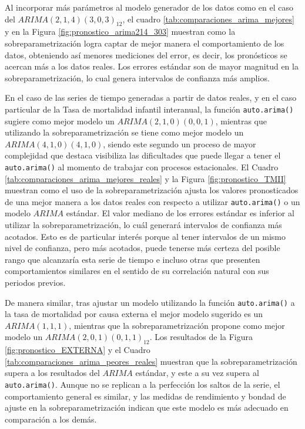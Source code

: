 \documentclass[
]{article}
\begin{document}
Al incorporar más parámetros al modelo generador de los datos como en el
caso del \(ARIMA(2,1,4)(3,0,3)_{12}\), el cuadro
\ref{tab:comparaciones_arima_mejores} y en la Figura
\ref{fig:pronostico_arima214_303} muestran como la sobreparametrización
logra captar de mejor manera el comportamiento de los datos, obteniendo
así menores mediciones del error, es decir, los pronósticos se acercan
más a los datos reales. Los errores estándar son de mayor magnitud en la
sobreparametrización, lo cual genera intervalos de confianza más
amplios.

En el caso de las series de tiempo generadas a partir de datos reales, y
en el caso particular de la Tasa de mortalidad infantil interanual, la
función \texttt{auto.arima()} sugiere como mejor modelo un
\(ARIMA(2,1,0)(0,0,1)\), mientras que utilizando la sobreparametrización
se tiene como mejor modelo un \(ARIMA(4,1,0)(4,1,0)\), siendo este
segundo un proceso de mayor complejidad que destaca visibiliza las
dificultades que puede llegar a tener el \texttt{auto.arima()} al
momento de trabajar con procesos estacionales. El Cuadro
\ref{tab:comparaciones_arima_mejores_reales} y la Figura
\ref{fig:pronostico_TMII} muestran como el uso de la
sobreparametrización ajusta los valores pronosticados de una mejor
manera a los datos reales con respecto a utilizar \texttt{auto.arima()}
o un modelo \(ARIMA\) estándar. El valor mediano de los errores estándar
es inferior al utilizar la sobreparametrización, lo cuál generará
intervalos de confianza más acotados. Esto es de particular interés
porque al tener intervalos de un mismo nivel de confianza, pero más
acotados, puede tenerse más certeza del posible rango que alcanzaría
esta serie de tiempo e incluso otras que presenten comportamientos
similares en el sentido de su correlación natural con sus periodos
previos.

De manera similar, tras ajustar un modelo utilizando la función
\texttt{auto.arima()} a la tasa de mortalidad por causa externa el mejor
modelo sugerido es un \(ARIMA(1,1,1)\), mientras que la
sobreparametrización propone como mejor modelo un
\(ARIMA(2,0,1)(0,1,1)_{12}\). Los resultados de la Figura
\ref{fig:pronostico_EXTERNA} y el Cuadro
\ref{tab:comparaciones_arima_peores_reales} muestran que la
sobreparametrización supera a los resultados del \(ARIMA\) estándar, y
este a su vez supera al \texttt{auto.arima()}. Aunque no se replican a
la perfección los saltos de la serie, el comportamiento general es
similar, y las medidas de rendimiento y bondad de ajuste en la
sobreparametrización indican que este modelo es más adecuado en
comparación a los demás.
\end{document}

